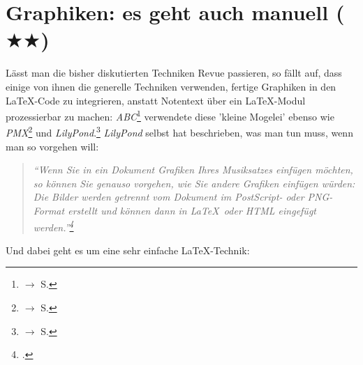 %
%
%


\section{Graphiken: es geht auch manuell ($\bigstar\bigstar$)}
\label{IncludeGraphics}

Lässt man die bisher diskutierten Techniken Revue passieren, so fällt auf, dass
einige von ihnen die generelle Techniken verwenden, fertige Graphiken in den
\LaTeX-Code zu integrieren, anstatt Notentext über ein \LaTeX-Modul prozessierbar
zu machen: \textit{ABC}\footnote{$\rightarrow$ S. \pageref{AbcGraphics}}
verwendete diese 'kleine Mogelei' ebenso wie \textit{PMX}\footnote{$\rightarrow$
S. \pageref{PmxGraphics}} und \textit{LilyPond}.\footnote{$\rightarrow$ S.
\pageref{LilyPondGraphics}} \textit{LilyPond} selbst hat beschrieben, was man tun
muss, wenn man so vorgehen will:

\begin{quote}\textit{\enquote{Wenn Sie in ein Dokument Grafiken Ihres
Musiksatzes einfügen möchten, so können Sie genauso vorgehen, wie Sie andere
Grafiken einfügen würden: Die Bilder werden getrennt vom Dokument im PostScript-
oder PNG-Format erstellt und können dann in \LaTeX\ oder HTML eingefügt
werden.}\footcite[vgl.][20]{LilyPond2018e} }\end{quote}

Und dabei geht es um eine sehr einfache \LaTeX-Technik:

